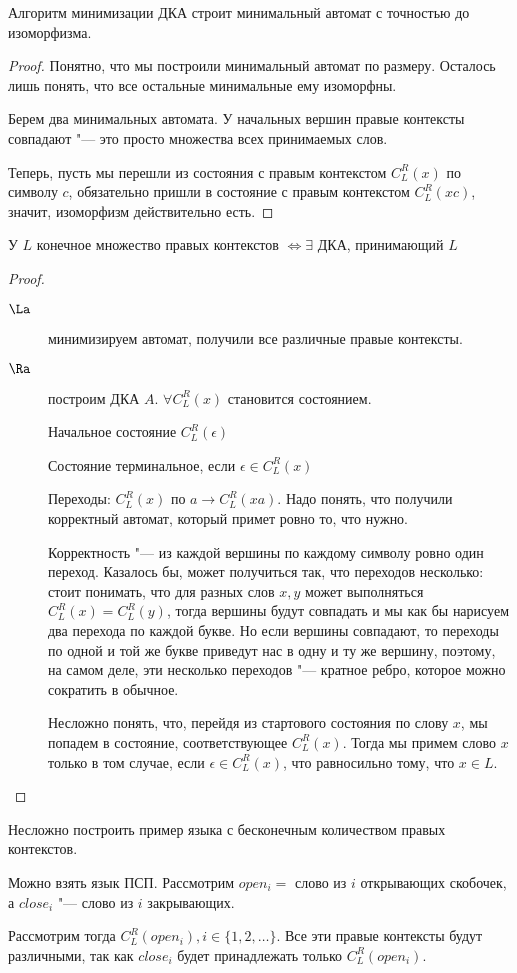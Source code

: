 \begin{theorem}
Алгоритм минимизации ДКА строит минимальный автомат с точностью до изоморфизма.
\end{theorem}
\begin{proof}
Понятно, что мы построили минимальный автомат по размеру. Осталось лишь понять, что все остальные минимальные ему изоморфны.

Берем два минимальных автомата. У начальных вершин правые контексты совпадают "--- это просто множества всех принимаемых слов.

Теперь, пусть мы перешли из состояния с правым контекстом $C_L^R(x)$ по символу $c$, обязательно пришли в состояние с правым контекстом $C_L^R(xc)$, значит, изоморфизм действительно есть.
\end{proof}

\begin{theorem}
У $L$ конечное множество правых контекстов $\iff \exists$ ДКА, принимающий $L$
\end{theorem}
\begin{proof}
\begin{description}
\item[$\La$] минимизируем автомат, получили все различные правые контексты.

\item[$\Ra$] построим ДКА $A$. $\forall C_L^R(x)$ становится состоянием.

Начальное состояние $C_L^R(\epsilon)$

Состояние терминальное, если $\epsilon \in C_L^R(x)$

Переходы: $C_L^R(x)$ по $a \to C_L^R(xa)$. 
Надо понять, что получили корректный автомат, который примет ровно то, что нужно.

Корректность "--- из каждой вершины по каждому символу ровно один переход. 
Казалось бы, может получиться так, что переходов несколько: стоит понимать, что для разных слов $x, y$ может выполняться $C_L^R(x) = C_L^R(y)$, 
тогда вершины будут совпадать и мы как бы нарисуем два перехода по каждой букве.
Но если вершины совпадают, то переходы по одной и той же букве приведут нас в одну и ту же вершину, поэтому, на самом деле, эти несколько переходов "--- кратное ребро, которое можно сократить в обычное.

Несложно понять, что, перейдя из стартового состояния по слову $x$, мы попадем в состояние, соответствующее $C_L^R(x)$.
Тогда мы примем слово $x$ только в том случае, если $\epsilon \in C_L^R(x)$, что равносильно тому, что $x \in L$.                                                                                  
\end{description}
\end{proof}
\begin{exmp}
Несложно построить пример языка с бесконечным количеством правых контекстов. 

Можно взять язык ПСП. Рассмотрим $open_i = $ слово из $i$ открывающих скобочек, а $close_i$ "--- слово из $i$ закрывающих.

Рассмотрим тогда $C_L^R(open_i), i \in \{1, 2, \dots\}$. Все эти правые контексты будут различными, так как $close_i$ будет принадлежать только $C_L^R(open_i)$.
\end{exmp}


